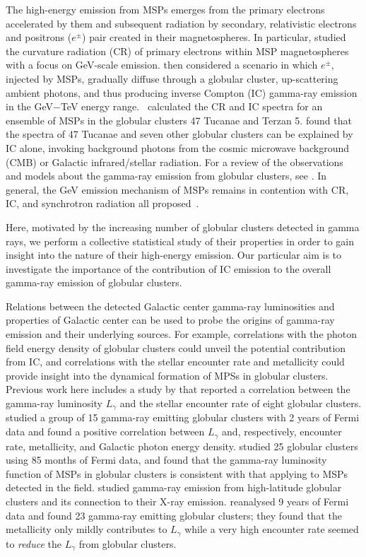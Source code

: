 \documentclass[doublespace,nopageskip]{VTthesis}
\begin{document}
The high-energy emission from MSPs emerges from the primary electrons accelerated by them and  subsequent radiation by secondary, relativistic electrons and positrons ($e^\pm$) pair created in their magnetospheres. In particular, \citet{2005ApJ...622..531H} studied the curvature radiation (CR) of primary electrons within MSP magnetospheres with a focus on GeV-scale emission. \citet{2007MNRAS.377..920B} then considered a scenario in which $e^\pm$, injected by MSPs, gradually diffuse through a globular cluster, up-scattering ambient photons, and thus producing inverse Compton (IC) gamma-ray emission in the GeV$-$TeV energy range.~\citet{2009ApJ...696L..52V} calculated the CR and IC spectra for an ensemble of MSPs in the globular clusters 47 Tucanae and Terzan 5. \citet{2010ApJ...723.1219C} found that the spectra of 47 Tucanae and seven other globular clusters can be explained by IC alone, invoking background photons from the cosmic microwave background (CMB) or Galactic infrared/stellar radiation. {For a review of the observations and models about the gamma-ray emission from globular clusters, see \citet{2016JASS...33....1T}.} In general, the GeV emission mechanism of MSPs remains in contention with CR, IC, and synchrotron radiation all  proposed~\citep{2021arXiv210105751H}.

Here, motivated by the increasing number of globular clusters detected in gamma rays, we perform a collective statistical study of their properties in order to gain insight into the nature of their high-energy emission. Our particular aim is to investigate the importance of the contribution of IC emission to the overall gamma-ray emission of globular clusters.

Relations between the detected Galactic center gamma-ray luminosities and properties of Galactic center can be used to probe the origins of gamma-ray emission and their underlying sources. For example, correlations with the photon field energy density of globular clusters could unveil the potential contribution from IC, and correlations with the stellar encounter rate and metallicity could provide insight into the dynamical formation of MPSs in globular clusters. Previous work here includes a study by \citet{2010A&A...524A..75A} that reported a correlation between the gamma-ray luminosity $L_\gamma$ and the stellar encounter rate of eight globular clusters. \citet{2011ApJ...726..100H} studied a group of 15 gamma-ray emitting globular clusters with 2 years of Fermi data and found a positive correlation between $L_\gamma$ and, respectively, encounter rate, metallicity, and Galactic photon energy density. \citet{2016JCAP...08..018H} studied 25 globular clusters using 85 months of Fermi data, and found that the gamma-ray luminosity function of MSPs in globular clusters is consistent with that applying to MSPs detected in the field. \citet{2018MNRAS.480.4782L} studied gamma-ray emission from high-latitude globular clusters and its connection to their X-ray emission. \citet{2019MNRAS.486..851D} reanalysed 9 years of Fermi data and found 23 gamma-ray emitting globular clusters; they found that the metallicity only mildly contributes to $L_\gamma$ while a very high encounter rate seemed to {\it reduce} the $L_\gamma$ from globular clusters.
\end{document}
